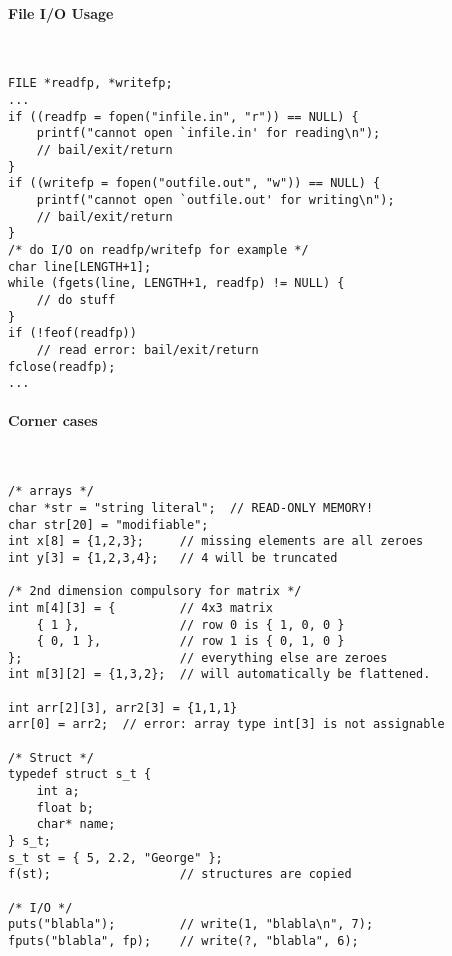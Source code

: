 \documentclass[11pt,twocolumn]{scrartcl}
\begin{document}
\paragraph{File I/O Usage}\hfill\\
\begin{lstlisting}
FILE *readfp, *writefp;
...
if ((readfp = fopen("infile.in", "r")) == NULL) {
    printf("cannot open `infile.in' for reading\n");
    // bail/exit/return
}
if ((writefp = fopen("outfile.out", "w")) == NULL) {
    printf("cannot open `outfile.out' for writing\n");
    // bail/exit/return
}
/* do I/O on readfp/writefp for example */
char line[LENGTH+1];
while (fgets(line, LENGTH+1, readfp) != NULL) {
    // do stuff
}
if (!feof(readfp))
    // read error: bail/exit/return
fclose(readfp);
...
\end{lstlisting}

\paragraph{Corner cases}\hfill\\
\begin{lstlisting}
/* arrays */
char *str = "string literal";  // READ-ONLY MEMORY!
char str[20] = "modifiable";
int x[8] = {1,2,3};     // missing elements are all zeroes
int y[3] = {1,2,3,4};   // 4 will be truncated

/* 2nd dimension compulsory for matrix */
int m[4][3] = {         // 4x3 matrix
    { 1 },              // row 0 is { 1, 0, 0 }
    { 0, 1 },           // row 1 is { 0, 1, 0 }
};                      // everything else are zeroes
int m[3][2] = {1,3,2};  // will automatically be flattened.

int arr[2][3], arr2[3] = {1,1,1}
arr[0] = arr2;  // error: array type int[3] is not assignable

/* Struct */
typedef struct s_t {
    int a;
    float b;
    char* name;
} s_t;
s_t st = { 5, 2.2, "George" };
f(st);                  // structures are copied

/* I/O */
puts("blabla");         // write(1, "blabla\n", 7);
fputs("blabla", fp);    // write(?, "blabla", 6);
\end{lstlisting}
\end{document}
